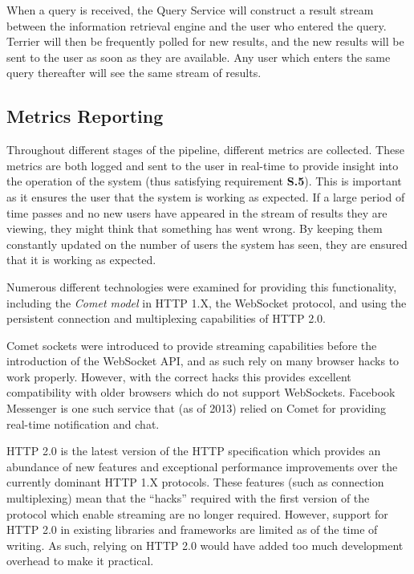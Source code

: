 \documentclass{l4proj}
\begin{document}
        When a query is received, the Query Service will construct a result stream between the information retrieval engine and the user who entered the query. Terrier will then be frequently polled for new results, and the new results will be sent to the user as soon as they are available. Any user which enters the same query thereafter will see the same stream of results.
              
        \subsection{Metrics Reporting}
        Throughout different stages of the pipeline, different metrics are collected. These metrics are both logged and sent to the user in real-time to provide insight into the operation of the system (thus satisfying requirement \textbf{S.5}). This is important as it ensures the user that the system is working as expected. If a large period of time passes and no new users have appeared in the stream of results they are viewing, they might think that something has went wrong. By keeping them constantly updated on the number of users the system has seen, they are ensured that it is working as expected.
        
        Numerous different technologies were examined for providing this functionality, including the \textit{Comet model} in HTTP 1.X, the WebSocket protocol, and using the persistent connection and multiplexing capabilities of HTTP 2.0.
        
        Comet sockets were introduced to provide streaming capabilities before the introduction of the WebSocket API, and as such rely on many browser hacks to work properly. However, with the correct hacks this provides excellent compatibility with older browsers which do not support WebSockets. Facebook Messenger is one such service that (as of 2013) relied on Comet for providing real-time notification and chat.
        
        HTTP 2.0 is the latest version of the HTTP specification which provides an abundance of new features and exceptional performance improvements over the currently dominant HTTP 1.X protocols. These features (such as connection multiplexing) mean that the ``hacks'' required with the first version of the protocol which enable streaming are no longer required. However, support for HTTP 2.0 in existing libraries and frameworks are limited as of the time of writing. As such, relying on HTTP 2.0 would have added too much development overhead to make it practical.
        
\end{document}
